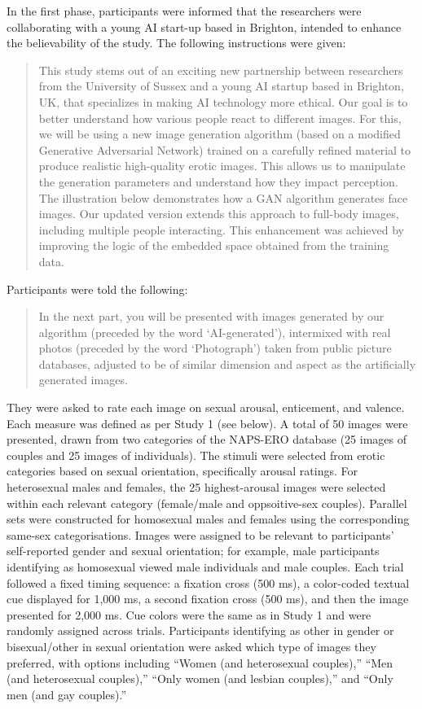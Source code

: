 \documentclass[
  jou,
  floatsintext,
  longtable,
  nolmodern,
  notxfonts,
  notimes,
  colorlinks=true,linkcolor=blue,citecolor=blue,urlcolor=blue]{apa7}
\begin{document}
In the first phase, participants were informed that the researchers were
collaborating with a young AI start-up based in Brighton, intended to
enhance the believability of the study. The following instructions were
given:

\begin{quote}
This study stems out of an exciting new partnership between researchers
from the University of Sussex and a young AI startup based in Brighton,
UK, that specializes in making AI technology more ethical. Our goal is
to better understand how various people react to different images. For
this, we will be using a new image generation algorithm (based on a
modified Generative Adversarial Network) trained on a carefully refined
material to produce realistic high-quality erotic images. This allows us
to manipulate the generation parameters and understand how they impact
perception. The illustration below demonstrates how a GAN algorithm
generates face images. Our updated version extends this approach to
full-body images, including multiple people interacting. This
enhancement was achieved by improving the logic of the embedded space
obtained from the training data.
\end{quote}

Participants were told the following:

\begin{quote}
In the next part, you will be presented with images generated by our
algorithm (preceded by the word `AI-generated'), intermixed with real
photos (preceded by the word `Photograph') taken from public picture
databases, adjusted to be of similar dimension and aspect as the
artificially generated images.
\end{quote}

They were asked to rate each image on sexual arousal, enticement, and
valence. Each measure was defined as per Study 1 (see below). A total of
50 images were presented, drawn from two categories of the NAPS-ERO
database (25 images of couples and 25 images of individuals). The
stimuli were selected from erotic categories based on sexual
orientation, specifically arousal ratings. For heterosexual males and
females, the 25 highest-arousal images were selected within each
relevant category (female/male and oppsoitive-sex couples). Parallel
sets were constructed for homosexual males and females using the
corresponding same-sex categorisations. Images were assigned to be
relevant to participants' self-reported gender and sexual orientation;
for example, male participants identifying as homosexual viewed male
individuals and male couples. Each trial followed a fixed timing
sequence: a fixation cross (500 ms), a color-coded textual cue displayed
for 1,000 ms, a second fixation cross (500 ms), and then the image
presented for 2,000 ms. Cue colors were the same as in Study 1 and were
randomly assigned across trials. Participants identifying as other in
gender or bisexual/other in sexual orientation were asked which type of
images they preferred, with options including ``Women (and heterosexual
couples),'' ``Men (and heterosexual couples),'' ``Only women (and
lesbian couples),'' and ``Only men (and gay couples).''
\end{document}
